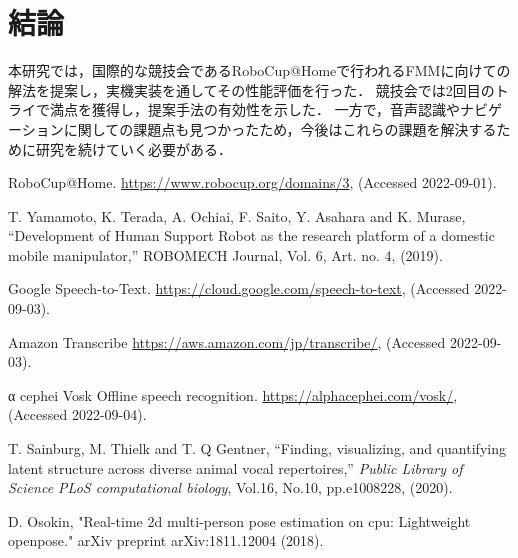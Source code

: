 \documentclass[a4j]{jarticle}
\begin{document}
\section{結論}
本研究では，国際的な競技会であるRoboCup@Homeで行われるFMMに向けての解法を提案し，実機実装を通してその性能評価を行った．
競技会では2回目のトライで満点を獲得し，提案手法の有効性を示した．
一方で，音声認識やナビゲーションに関しての課題点も見つかったため，今後はこれらの課題を解決するために研究を続けていく必要がある．

\begin{thebibliography}{99}

RoboCup@Home. \url{https://www.robocup.org/domains/3}, (Accessed 2022-09-01).

T. Yamamoto, K. Terada, A. Ochiai, F. Saito, Y. Asahara and K. Murase, “Development of Human Support Robot as the research platform of a domestic mobile manipulator,” ROBOMECH Journal, Vol. 6, Art. no. 4, (2019).




Google Speech-to-Text. \url{https://cloud.google.com/speech-to-text}, (Accessed 2022-09-03).

Amazon Transcribe \url{https://aws.amazon.com/jp/transcribe/}, (Accessed 2022-09-03).

α cephei Vosk Offline speech recognition. \url{https://alphacephei.com/vosk/}, (Accessed 2022-09-04).

T. Sainburg, M. Thielk and T. Q Gentner,
“Finding, visualizing, and quantifying latent structure across diverse animal vocal repertoires,”
{\it Public Library of Science PLoS computational biology},
Vol.16,
No.10,
pp.e1008228,
(2020).

D. Osokin, "Real-time 2d multi-person pose estimation on cpu: Lightweight openpose." arXiv preprint arXiv:1811.12004 (2018).


\end{thebibliography}
\end{document}
